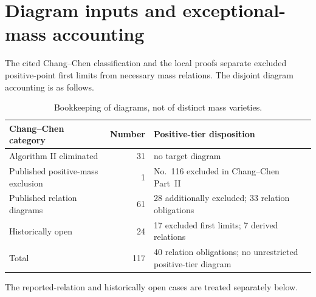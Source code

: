 \documentclass[11pt]{amsart}
\theoremstyle{remark}
\begin{document}
\section{Diagram inputs and exceptional-mass accounting}\label{sec:input}
The cited Chang--Chen classification and the local proofs separate excluded positive-point first limits from necessary mass relations. The disjoint diagram accounting is as follows.
\begin{table}[ht]
\centering\small
\begin{tabular}{p{5.3cm}r p{7.2cm}}
\hline
Chang--Chen category & Number & Positive-tier disposition \\
\hline
Algorithm II eliminated & 31 & no target diagram \\
Published positive-mass exclusion & 1 & No.~116 excluded in Chang--Chen Part~II \\
Published relation diagrams & 61 & 28 additionally excluded; 33 relation obligations \\
Historically open & 24 & 17 excluded first limits; 7 derived relations \\
\hline
Total & 117 & 40 relation obligations; no unrestricted positive-tier diagram \\
\hline
\end{tabular}
\caption{Bookkeeping of diagrams, not of distinct mass varieties.}\label{tab:status}
\end{table}
The reported-relation and historically open cases are treated separately below.
\end{document}
